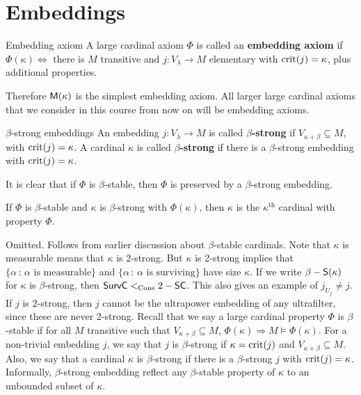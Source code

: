 \documentclass{article}
\begin{document}
\section{Embeddings}

\begin{fancydefine}{Embedding axiom}
    A large cardinal axiom $\Phi$ is called an \textbf{embedding axiom} if $\Phi(\kappa) \Leftrightarrow$ there is $M$ transitive and $j: V_{\lambda} \to M$ elementary with $\operatorname{crit}(j)=\kappa$, plus additional properties.
\end{fancydefine}
Therefore $\mathsf{M}(\kappa)$ is the simplest embedding axiom. All larger large cardinal axioms that we consider in this course from now on will be embedding axioms.

\begin{fancydefine}{$\beta$-strong embeddings}
    An embedding $j: V_{\lambda} \to M$ is called $\beta$\textbf{-strong} if $V_{\kappa+\beta} \subseteq M$, with $\operatorname{crit}(j)=\kappa$.\gap 
    A cardinal $\kappa$ is called $\beta$\textbf{-strong} if there is a $\beta$-strong embedding with $\operatorname{crit}(j)=\kappa$.
\end{fancydefine}
It is clear that if $\Phi$ is $\beta$-stable, then $\Phi$ is preserved by a $\beta$-strong embedding.
\begin{corr}{}
    If $\Phi$ is $\beta$-stable and $\kappa$ is $\beta$-strong with $\Phi(\kappa)$, then $\kappa$ is the $\kappa^{\text{th}}$ cardinal with property $\Phi$.
\end{corr}
\proof Omitted. Follows from earlier discussion about $\beta$-stable cardinals. \endproof 
Note that $\kappa$ is measurable means that $\kappa$ is 2-strong. But $\kappa$ is 2-strong implies that $\{\alpha \, : \, \alpha \text{ is measurable}\}$ and $\{ \alpha \, : \, \alpha \text{ is surviving}\}$ have size $\kappa$. \gap 
If we write $\beta-\mathsf{S}(\kappa)$ for $\kappa$ is $\beta$-strong, then $\mathsf{SurvC} <_{\operatorname{Cons}} 2-\mathsf{SC}$. This also gives an example of $j_{U_{j}} \neq j$. If $j$ is $2$-strong, then $j$ cannot be the ultrapower embedding of any ultrafilter, since these are never $2$-strong.\gap 
\newlec 
Recall that we say a large cardinal property $\Phi$ is $\beta$-stable if for all $M$ transitive such that $V_{\kappa+\beta} \subseteq M$, $\Phi(\kappa) \Rightarrow M \models \Phi(\kappa)$. \gap 
For a non-trivial embedding $j$, we say that $j$ is $\beta$-strong if $\kappa = \operatorname{crit}(j)$ and $V_{\kappa + \beta} \subseteq M$. Also, we say that a cardinal $\kappa$ is $\beta$-strong if there is a $\beta$-strong $j$ with $\operatorname{crit}(j)=\kappa$. \gap
Informally, $\beta$-strong embedding reflect any $\beta$-stable property of $\kappa$ to an unbounded subset of $\kappa$.
\end{document}
